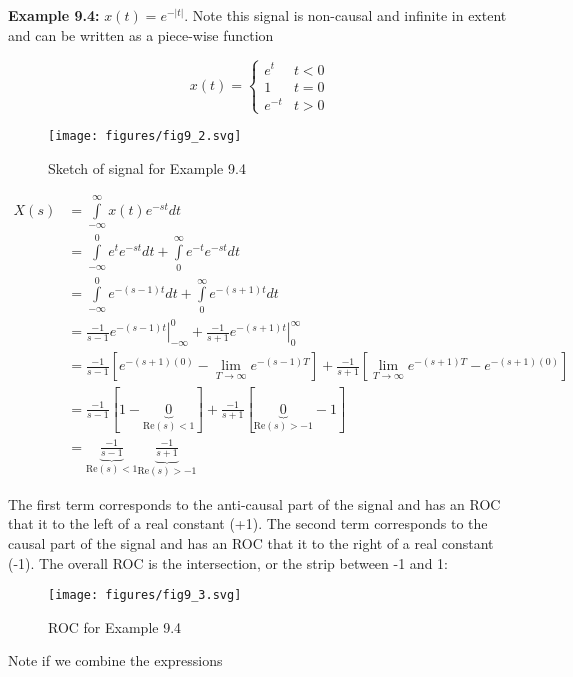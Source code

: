 \documentclass{article}
\begin{document}
\textbf{Example 9.4:} $x(t) = e^{-|t|}$. Note this signal is non-causal and infinite in extent and can be written as a piece-wise function

\[
x(t) = \left\{ \begin{array}{cc}
  e^t & t < 0\\
  1 & t = 0\\
  e^{-t} & t > 0
\end{array}
\right.
\]

\begin{figure}
  \centering
  \texttt{[image: figures/fig9\_2.svg]}
  \caption{Sketch of signal for Example 9.4}
\end{figure}

\begin{align}
  X(s) &= \int\limits_{-\infty}^{\infty} x(t) e^{-st} dt\\
  &= \int\limits_{-\infty}^{0} e^{t} e^{-st} dt + \int\limits_{0}^{\infty} e^{-t} e^{-st} dt\\
  &= \int\limits_{-\infty}^{0} e^{-(s-1)t} dt + \int\limits_{0}^{\infty} e^{-(s+1)t} dt\\
  &= \left. \frac{-1}{s-1} e^{-(s-1)t} \right|_{-\infty}^{0} + \left. \frac{-1}{s+1} e^{-(s+1)t} \right|_{0}^{\infty}\\
  &= \frac{-1}{s-1} \left[e^{-(s+1)(0)} - \lim_{T\rightarrow \infty} e^{-(s-1)T} \right] + \frac{-1}{s+1} \left[\lim_{T\rightarrow \infty} e^{-(s+1)T} - e^{-(s+1)(0)} \right]\\
  &= \frac{-1}{s-1} \left[1 - \underbrace{0}_{\text{Re}(s) < 1} \right] + \frac{-1}{s+1} \left[\underbrace{0}_{\text{Re}(s) > -1} - 1 \right]\\
  &= \underbrace{\frac{-1}{s-1}}_{\text{Re}(s) < 1} \underbrace{\frac{-1}{s+1}}_{\text{Re}(s) > -1}
\end{align}

The first term corresponds to the anti-causal part of the signal and has an ROC that it to the left of a real constant (+1). The second term corresponds to the causal part of the signal and has an ROC that it to the right of a real constant (-1). The overall ROC is the intersection, or the strip between -1 and 1:

\begin{figure}
  \centering
  \texttt{[image: figures/fig9\_3.svg]}
  \caption{ROC for Example 9.4}
\end{figure}

Note if we combine the expressions
\end{document}
